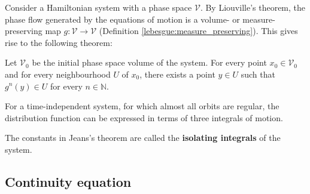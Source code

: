 
    Consider a Hamiltonian system with a phase space $\mathcal{V}$. By Liouville's theorem, the phase flow generated by the equations of motion is a volume- or measure-preserving map $g:\mathcal{V}\rightarrow\mathcal{V}$ (Definition \ref{lebesgue:measure_preserving}). This gives rise to the following theorem:
    \begin{theorem}
        Let $\mathcal{V}_0$ be the initial phase space volume of the system. For every point $x_0\in\mathcal{V}_0$ and for every neighbourhood $U$ of $x_0$, there exists a point $y\in U$ such that $g^n(y)\in U$ for every $n\in\mathbb{N}$.
    \end{theorem}

    \begin{theorem}
        For a time-independent system, for which almost all orbits are regular, the distribution function can be expressed in terms of three integrals of motion.
    \end{theorem}
    The constants in Jeans's theorem are called the \textup{\textbf{isolating integrals}} of the system.

\subsection{Continuity equation}

